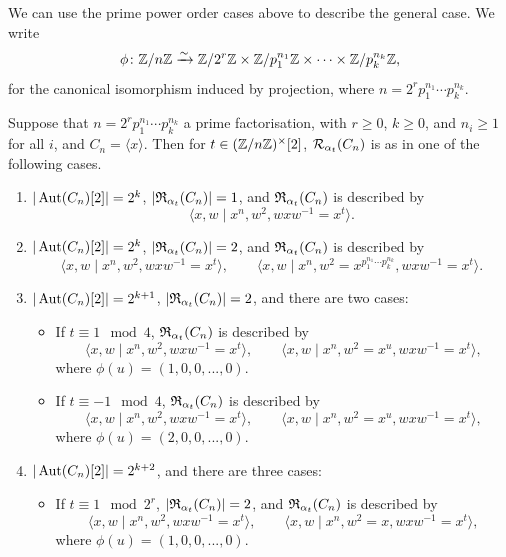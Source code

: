 We can use the prime power order cases above to describe the general case. We write
\[
\phi \colon {\mathbb Z} / n{\mathbb Z} \xrightarrow{\sim} {\mathbb Z} / 2^r {\mathbb Z} \times {\mathbb Z} / p_1^{n_1} {\mathbb Z} \times \cdots \times {\mathbb Z} / p_k^{n_k} {\mathbb Z},
\]
for the canonical isomorphism induced by projection, where $n = 2^r p_1^{n_1} \cdots p_k^{n_k}$.

\begin{cor}
Suppose that $n = 2^r p_1^{n_1} \cdots p_k^{n_k}$ a prime factorisation, with $r \geq 0$, $k \geq 0$, and $n_i \geq 1$ for all $i$, and $C_n = \langle x \rangle$. Then for $t \in ({\mathbb Z} / n{\mathbb Z})^{\times}[2]$, ${\mathcal R}_{\alpha_t}(C_n)$ is as in one of the following cases.
\begin{enumerate}
  \item[\emph{($r = 0$)}] $|\operatorname{Aut}(C_n)[2]| = 2^k$, $|{\mathfrak R}_{\alpha_t}(C_n)| = 1$, and ${\mathfrak R}_{\alpha_t}(C_n)$ is described by
  \[
    \langle x , w \mid x^n, w^2, wxw^{-1} = x^t \rangle.
  \]
  \item[\emph{($r = 1$)}] $|\operatorname{Aut}(C_n)[2]| = 2^k$, $|{\mathfrak R}_{\alpha_t}(C_n)| = 2$, and ${\mathfrak R}_{\alpha_t}(C_n)$ is described by
  \[
    \langle x , w \mid x^n, w^2, wxw^{-1} = x^t \rangle, \qquad \langle x , w \mid x^n, w^2 = x^{p_1^{n_1} \cdots p_k^{n_k}}, wxw^{-1} = x^t \rangle.
  \]
  \item[\emph{($r = 2$)}] $|\operatorname{Aut}(C_n)[2]| = 2^{k+1}$, $|{\mathfrak R}_{\alpha_t}(C_n)| = 2$, and there are two cases:
  \begin{itemize}
    \item If $t \equiv 1 \!\! \mod 4$, ${\mathfrak R}_{\alpha_t}(C_n)$ is described by
    \[
    \langle x , w \mid x^n, w^2, wxw^{-1} = x^t \rangle, \qquad \langle x , w \mid x^n, w^2 = x^u, wxw^{-1} = x^t \rangle,
    \]
   where $\phi(u) = (1,0,0, ... , 0)$.
  \item If $t \equiv -1 \!\! \mod 4$, ${\mathfrak R}_{\alpha_t}(C_n)$ is described by
  \[
    \langle x , w \mid x^n, w^2, wxw^{-1} = x^t \rangle, \qquad \langle x , w \mid x^n, w^2 = x^u, wxw^{-1} = x^t \rangle,
  \]
  where $\phi(u) =  (2,0,0, ... , 0)$.
  \end{itemize}
  \item[\emph{($r \geq 3$)}] $|\operatorname{Aut}(C_n)[2]| = 2^{k+2}$, and there are three cases:
  \begin{itemize}
  \item If $t \equiv 1 \!\! \mod 2^r$, $|{\mathfrak R}_{\alpha_t}(C_n)| = 2$, and ${\mathfrak R}_{\alpha_t}(C_n)$ is described by
    \[
    \langle x , w \mid x^n, w^2, wxw^{-1} = x^t \rangle, \qquad \langle x , w \mid x^n, w^2 = x, wxw^{-1} = x^t \rangle,
  \]
  where $\phi(u) = (1,0,0, ... , 0)$.

\end{itemize}
\end{enumerate}
\end{cor}
